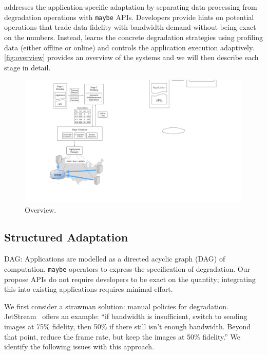 \section{\sysname{}}
\label{sec:system}

\sysname{} addresses the application-specific adaptation by separating data
processing from degradation operations with \texttt{maybe} APIs. Developers
provide hints on potential operations that trade data fidelity with bandwidth
demand without being exact on the numbers. Instead, \sysname{} learns the
concrete degradation strategies using profiling data (either offline or online)
and controls the application execution adaptively. \autoref{fig:overview}
provides an overview of the systems and we will then describe each stage in
detail.

\begin{figure}
  \centering
  \includegraphics[width=.9\linewidth]{figures/system.pdf}
  \caption{\sysname{} Overview.}
  \label{fig:overview}
\end{figure}

\subsection{Structured Adaptation}
\label{sec:struct-adapt}

DAG: Applications are modelled as a directed acyclic graph (DAG) of
computation.  \texttt{maybe} operators to express the specification of
degradation. Our propose APIs do not require developers to be exact on the
quantity; integrating this into existing applications requires minimal effort.

We first consider a strawman solution: manual policies for
degradation. JetStream~\cite{rabkin2014aggregation} offers an example: ``if
bandwidth is insufficient, switch to sending images at 75\% fidelity, then 50\%
if there still isn't enough bandwidth. Beyond that point, reduce the frame rate,
but keep the images at 50\% fidelity.'' We identify the following issues with
this approach.

